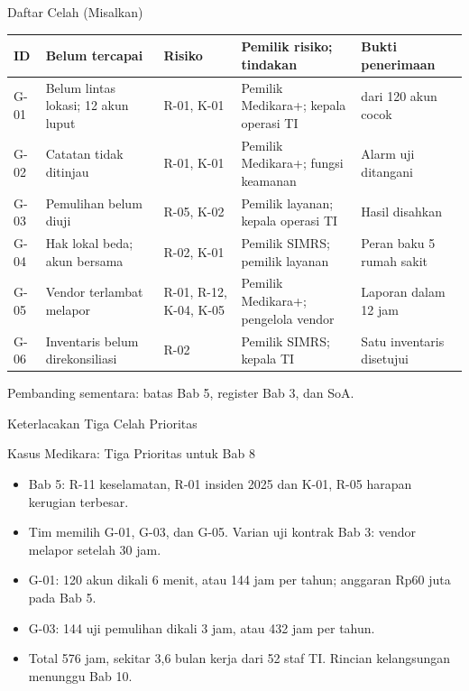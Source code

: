 \documentclass[aspectratio=169, table, 12pt]{beamer}
\begin{document}
\begin{frame}{{\Large Daftar Celah (Misalkan)}}
  \vspace{2pt}
  \scriptsize
  \begin{tabularx}{\textwidth}{|>{\raggedright\arraybackslash}p{}|>{\raggedright\arraybackslash}X|>{\raggedright\arraybackslash}p{}|>{\raggedright\arraybackslash}p{}|>{\raggedright\arraybackslash}X|}
    \hline
    \textbf{ID} & \textbf{Belum tercapai} & \textbf{Risiko} & \textbf{Pemilik risiko; tindakan} &
    \textbf{Bukti penerimaan} \\ \hline
    G-01 & Belum lintas lokasi; 12 akun luput & R-01, K-01 & Pemilik Medikara+; kepala operasi TI &
    120 dari 120 akun cocok \\ \hline
    G-02 & Catatan tidak ditinjau & R-01, K-01 & Pemilik Medikara+; fungsi keamanan & Alarm uji
    ditangani \\ \hline
    G-03 & Pemulihan belum diuji & R-05, K-02 & Pemilik layanan; kepala operasi TI & Hasil disahkan
    \\ \hline
    G-04 & Hak lokal beda; akun bersama & R-02, K-01 & Pemilik SIMRS; pemilik layanan & Peran baku 5
    rumah sakit \\ \hline
    G-05 & Vendor terlambat melapor & R-01, R-12, K-04, K-05 & Pemilik Medikara+; pengelola vendor &
    Laporan dalam 12 jam \\ \hline
    G-06 & Inventaris belum direkonsiliasi & R-02 & Pemilik SIMRS; kepala TI & Satu inventaris
    disetujui \\ \hline
  \end{tabularx}

  \vspace{4pt}
  \small Pembanding sementara: batas Bab 5, register Bab 3, dan SoA.
\end{frame}

\begin{frame}{{\Large Keterlacakan Tiga Celah Prioritas}}
  \begin{center}
    \resizebox{0.95\textwidth}{!}{}
  \end{center}
\end{frame}

\begin{frame}{{\Large Kasus Medikara: Tiga Prioritas untuk Bab 8}}
  \vspace{6pt}
  \small
  \begin{itemize}
    \item Bab 5: R-11 keselamatan, R-01 insiden 2025 dan K-01, R-05 harapan kerugian terbesar.
    \item Tim memilih G-01, G-03, dan G-05. Varian uji kontrak Bab 3: vendor melapor setelah 30 jam.
    \item G-01: 120 akun dikali 6 menit, atau 144 jam per tahun; anggaran Rp60 juta pada Bab 5.
    \item G-03: 144 uji pemulihan dikali 3 jam, atau 432 jam per tahun.
    \item Total 576 jam, sekitar 3,6 bulan kerja dari 52 staf TI. Rincian kelangsungan menunggu
          Bab 10.
  \end{itemize}
\end{frame}
\end{document}
